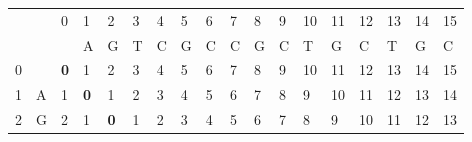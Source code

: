 \documentclass[times, utf8, zavrsni]{fer}
\begin{document}
\begin{table}[]
\begin{tabular}{|ll|llllllllllllllll|}
\hline
                         &   & 0                               & 1                               & 2                               & 3                               & 4                               & 5                               & 6                               & 7                               & 8                               & 9                               & 10                              & 11                              & 12                              & 13                      & 14                      & 15 \\ \cline{3-18} 
                         &   & \multicolumn{1}{l|}{}           & A                               & G                               & T                               & C                               & G                               & C                               & C                               & G                               & C                               & T                               & G                               & C                               & T                       & G                       & C  \\ \hline
\multicolumn{1}{|l|}{0}  &   & \multicolumn{1}{l|}{\textbf{0}} & \multicolumn{1}{l|}{1}          & \multicolumn{1}{l|}{2}          & \multicolumn{1}{l|}{3}          & \multicolumn{1}{l|}{4}          & \multicolumn{1}{l|}{5}          & \multicolumn{1}{l|}{6}          & \multicolumn{1}{l|}{7}          & \multicolumn{1}{l|}{8}          & \multicolumn{1}{l|}{9}          & \multicolumn{1}{l|}{10}         & \multicolumn{1}{l|}{11}         & \multicolumn{1}{l|}{12}         & \multicolumn{1}{l|}{13} & \multicolumn{1}{l|}{14} & 15 \\ \cline{2-18} 
\multicolumn{1}{|l|}{1}  & A & \multicolumn{1}{l|}{1}          & \multicolumn{1}{l|}{\textbf{0}} & \multicolumn{1}{l|}{1}          & \multicolumn{1}{l|}{2}          & \multicolumn{1}{l|}{3}          & \multicolumn{1}{l|}{4}          & \multicolumn{1}{l|}{5}          & \multicolumn{1}{l|}{6}          & \multicolumn{1}{l|}{7}          & \multicolumn{1}{l|}{8}          & \multicolumn{1}{l|}{9}          & \multicolumn{1}{l|}{10}         & \multicolumn{1}{l|}{11}         & \multicolumn{1}{l|}{12} & \multicolumn{1}{l|}{13} & 14 \\ \cline{3-18} 
\multicolumn{1}{|l|}{2}  & G & \multicolumn{1}{l|}{2}          & \multicolumn{1}{l|}{1}          & \multicolumn{1}{l|}{\textbf{0}} & \multicolumn{1}{l|}{1}          & \multicolumn{1}{l|}{2}          & \multicolumn{1}{l|}{3}          & \multicolumn{1}{l|}{4}          & \multicolumn{1}{l|}{5}          & \multicolumn{1}{l|}{6}          & \multicolumn{1}{l|}{7}          & \multicolumn{1}{l|}{8}          & \multicolumn{1}{l|}{9}          & \multicolumn{1}{l|}{10}         & \multicolumn{1}{l|}{11} & \multicolumn{1}{l|}{12} & 13 \\ \cline{3-18} 

\end{tabular}
\end{table}
\end{document}
